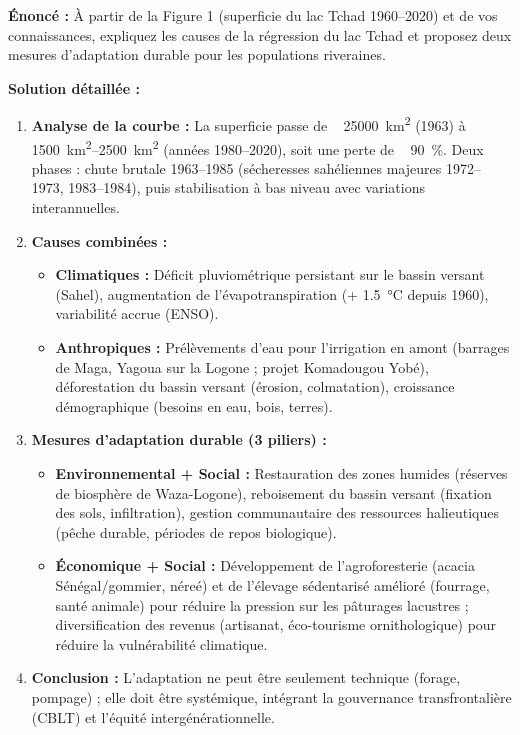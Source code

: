 \documentclass[11pt]{article}
\begin{document}
\begin{exoresolu}
\textbf{Énoncé :} À partir de la Figure 1 (superficie du lac Tchad 1960--2020) et de vos connaissances, expliquez les causes de la régression du lac Tchad et proposez deux mesures d'adaptation durable pour les populations riveraines.

\textbf{Solution détaillée :}
\begin{enumerate}
    \item \textbf{Analyse de la courbe :} La superficie passe de ~ \SI{25000}{\square\kilo\meter} (1963) à ~ \SIrange{1500}{2500}{\square\kilo\meter} (années 1980--2020), soit une perte de ~ \SI{90}{\%}. Deux phases : chute brutale 1963--1985 (sécheresses sahéliennes majeures 1972--1973, 1983--1984), puis stabilisation à bas niveau avec variations interannuelles.
    \item \textbf{Causes combinées :}
    \begin{itemize}
        \item \textbf{Climatiques :} Déficit pluviométrique persistant sur le bassin versant (Sahel), augmentation de l'évapotranspiration (+ \SI{1,5}{\celsius} depuis 1960), variabilité accrue (ENSO).
        \item \textbf{Anthropiques :} Prélèvements d'eau pour l'irrigation en amont (barrages de Maga, Yagoua sur la Logone ; projet Komadougou Yobé), déforestation du bassin versant (érosion, colmatation), croissance démographique (besoins en eau, bois, terres).
    \end{itemize}
    \item \textbf{Mesures d'adaptation durable (3 piliers) :}
    \begin{itemize}
        \item \textbf{Environnemental + Social :} Restauration des zones humides (réserves de biosphère de Waza-Logone), reboisement du bassin versant (fixation des sols, infiltration), gestion communautaire des ressources halieutiques (pêche durable, périodes de repos biologique).
        \item \textbf{Économique + Social :} Développement de l'agroforesterie (acacia Sénégal/gommier, néreé) et de l'élevage sédentarisé amélioré (fourrage, santé animale) pour réduire la pression sur les pâturages lacustres ; diversification des revenus (artisanat, éco-tourisme ornithologique) pour réduire la vulnérabilité climatique.
    \end{itemize}
    \item \textbf{Conclusion :} L'adaptation ne peut être seulement technique (forage, pompage) ; elle doit être systémique, intégrant la gouvernance transfrontalière (CBLT) et l'équité intergénérationnelle.
\end{enumerate}
\end{exoresolu}
\end{document}
